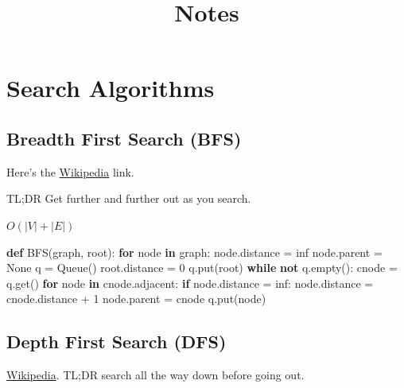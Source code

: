 \documentclass[12pt]{article}
\title{Notes}
\newenvironment{Shaded}{}{}
\newcommand{\KeywordTok}[1]{\textcolor[rgb]{0.00,0.44,0.13}{\textbf{{#1}}}}
\newcommand{\DecValTok}[1]{\textcolor[rgb]{0.25,0.63,0.44}{{#1}}}
\newcommand{\NormalTok}[1]{{#1}}
\newcommand{\VariableTok}[1]{\textcolor[rgb]{0.10,0.09,0.49}{{#1}}}
\newcommand{\ControlFlowTok}[1]{\textcolor[rgb]{0.00,0.44,0.13}{\textbf{{#1}}}}
\newcommand{\OperatorTok}[1]{\textcolor[rgb]{0.40,0.40,0.40}{{#1}}}
\begin{document}
    
    
    \maketitle
    
    

    
    \section{Search Algorithms}\label{search-algorithms}

    \subsection{Breadth First Search (BFS)}\label{breadth-first-search-bfs}

Here's the
\href{https://en.wikipedia.org/wiki/Breadth-first_search}{Wikipedia}
link.

TL;DR Get further and further out as you search.

\(O(|V| + |E|)\)

\begin{Shaded}
\begin{Highlighting}[]
\KeywordTok{def} \NormalTok{BFS(graph, root):}
  \ControlFlowTok{for} \NormalTok{node }\KeywordTok{in} \NormalTok{graph:}
    \NormalTok{node.distance }\OperatorTok{=} \NormalTok{inf}
    \NormalTok{node.parent }\OperatorTok{=} \VariableTok{None}
  \NormalTok{q }\OperatorTok{=} \NormalTok{Queue()}
  \NormalTok{root.distance }\OperatorTok{=} \DecValTok{0}
  \NormalTok{q.put(root)}
  \ControlFlowTok{while} \KeywordTok{not} \NormalTok{q.empty():}
    \NormalTok{cnode }\OperatorTok{=} \NormalTok{q.get()}
    \ControlFlowTok{for} \NormalTok{node }\KeywordTok{in} \NormalTok{cnode.adjacent:}
      \ControlFlowTok{if} \NormalTok{node.distance }\OperatorTok{=} \NormalTok{inf:}
        \NormalTok{node.distance }\OperatorTok{=} \NormalTok{cnode.distance }\OperatorTok{+} \DecValTok{1}
        \NormalTok{node.parent }\OperatorTok{=} \NormalTok{cnode}
        \NormalTok{q.put(node)}
\end{Highlighting}
\end{Shaded}

    \subsection{Depth First Search (DFS)}\label{depth-first-search-dfs}

\href{https://en.wikipedia.org/wiki/Depth-first_search}{Wikipedia}.
TL;DR search all the way down before going out.
\end{document}
